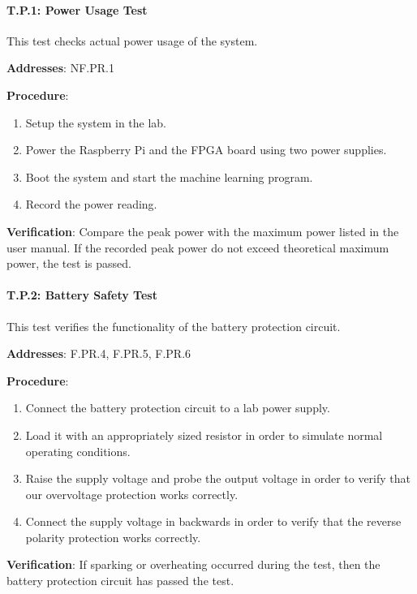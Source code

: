 \paragraph{T.P.1: Power Usage Test}

This test checks actual power usage of the system.

\textbf{Addresses}: NF.PR.1

\textbf{Procedure}:
\begin{enumerate}[noitemsep]
    \item Setup the system in the lab.
    \item Power the Raspberry Pi and the FPGA board using two power supplies.
    \item Boot the system and start the machine learning program.
    \item Record the power reading.
\end{enumerate}

\textbf{Verification}: 
Compare the peak power with the maximum power listed in the user manual. If the recorded peak power do not exceed theoretical maximum power, the test is passed. 

%

\paragraph{T.P.2: Battery Safety Test}

This test verifies the functionality of the battery protection circuit.

\textbf{Addresses}: F.PR.4, F.PR.5, F.PR.6

\textbf{Procedure}:
\begin{enumerate}[noitemsep]
    \item Connect the battery protection circuit to a lab power supply.
    \item Load it with an appropriately sized resistor in order to simulate normal operating conditions.
    \item Raise the supply voltage and probe the output voltage in order to verify that our overvoltage protection works correctly.
    \item Connect the supply voltage in backwards in order to verify that the reverse polarity protection works correctly.
\end{enumerate}

\textbf{Verification}: 
If sparking or overheating occurred during the test, then the battery protection circuit has passed the test.